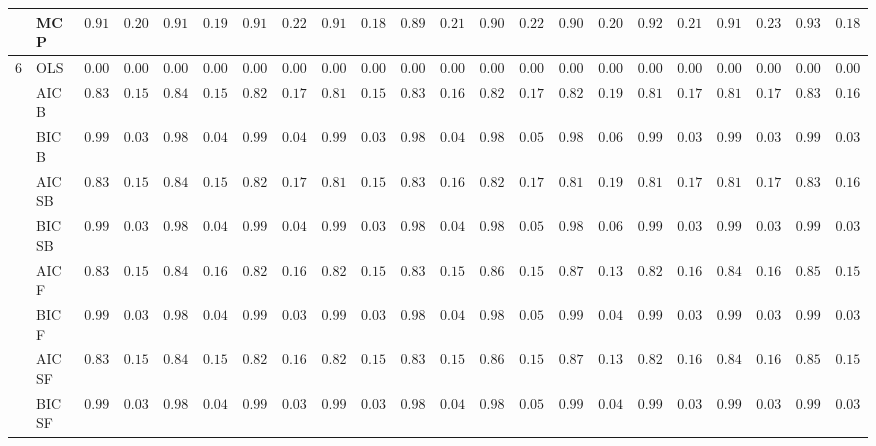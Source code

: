 \begin{tabular}{ll|ll|llllll|llllll|llllll}
 & MCP  & $0.9117$ & $0.2002$ & $0.9183$ & $0.1961$ & $0.9133$ & $0.2241$ & $0.9100$ & $0.1872$ & $0.8983$ & $0.2183$ & $0.9033$ & $0.2250$ & $0.9083$ & $0.2043$ & $0.9250$ & $0.2111$ & $0.9117$ & $0.2302$ & $0.9317$ & $0.1867$ \\\hline
6 & OLS  & $0.0000$ & $0.0000$ & $0.0000$ & $0.0000$ & $0.0000$ & $0.0000$ & $0.0000$ & $0.0000$ & $0.0000$ & $0.0000$ & $0.0000$ & $0.0000$ & $0.0000$ & $0.0000$ & $0.0000$ & $0.0000$ & $0.0000$ & $0.0000$ & $0.0000$ & $0.0000$ \\
 & AIC B  & $0.8317$ & $0.1526$ & $0.8450$ & $0.1576$ & $0.8217$ & $0.1729$ & $0.8183$ & $0.1573$ & $0.8317$ & $0.1633$ & $0.8250$ & $0.1747$ & $0.8200$ & $0.1934$ & $0.8183$ & $0.1710$ & $0.8183$ & $0.1726$ & $0.8317$ & $0.1633$ \\
 & BIC B  & $0.9917$ & $0.0365$ & $0.9883$ & $0.0489$ & $0.9900$ & $0.0463$ & $0.9950$ & $0.0371$ & $0.9883$ & $0.0427$ & $0.9850$ & $0.0535$ & $0.9850$ & $0.0631$ & $0.9933$ & $0.0328$ & $0.9917$ & $0.0365$ & $0.9917$ & $0.0365$ \\
 & AIC SB  & $0.8317$ & $0.1526$ & $0.8450$ & $0.1576$ & $0.8217$ & $0.1729$ & $0.8183$ & $0.1573$ & $0.8317$ & $0.1633$ & $0.8250$ & $0.1747$ & $0.8183$ & $0.1926$ & $0.8183$ & $0.1710$ & $0.8183$ & $0.1726$ & $0.8317$ & $0.1633$ \\
 & BIC SB  & $0.9917$ & $0.0365$ & $0.9883$ & $0.0489$ & $0.9900$ & $0.0463$ & $0.9950$ & $0.0371$ & $0.9883$ & $0.0427$ & $0.9850$ & $0.0535$ & $0.9850$ & $0.0631$ & $0.9933$ & $0.0328$ & $0.9917$ & $0.0365$ & $0.9917$ & $0.0365$ \\
 & AIC F  & $0.8317$ & $0.1526$ & $0.8467$ & $0.1601$ & $0.8250$ & $0.1698$ & $0.8217$ & $0.1540$ & $0.8383$ & $0.1525$ & $0.8600$ & $0.1530$ & $0.8717$ & $0.1399$ & $0.8250$ & $0.1613$ & $0.8400$ & $0.1640$ & $0.8517$ & $0.1551$ \\
 & BIC F  & $0.9917$ & $0.0365$ & $0.9883$ & $0.0489$ & $0.9933$ & $0.0328$ & $0.9950$ & $0.0371$ & $0.9883$ & $0.0427$ & $0.9850$ & $0.0535$ & $0.9917$ & $0.0435$ & $0.9933$ & $0.0328$ & $0.9917$ & $0.0365$ & $0.9917$ & $0.0365$ \\
 & AIC SF  & $0.8317$ & $0.1526$ & $0.8483$ & $0.1573$ & $0.8250$ & $0.1698$ & $0.8217$ & $0.1540$ & $0.8383$ & $0.1525$ & $0.8600$ & $0.1530$ & $0.8717$ & $0.1399$ & $0.8250$ & $0.1613$ & $0.8400$ & $0.1640$ & $0.8517$ & $0.1551$ \\
 & BIC SF  & $0.9917$ & $0.0365$ & $0.9883$ & $0.0489$ & $0.9933$ & $0.0328$ & $0.9950$ & $0.0371$ & $0.9883$ & $0.0427$ & $0.9850$ & $0.0535$ & $0.9917$ & $0.0435$ & $0.9933$ & $0.0328$ & $0.9917$ & $0.0365$ & $0.9917$ & $0.0365$ \\

\end{tabular}
